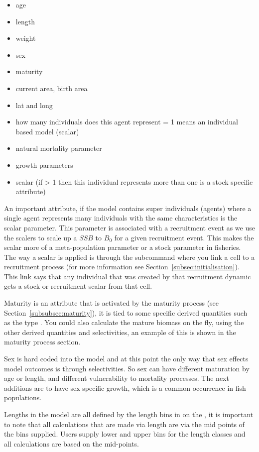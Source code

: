 \begin{itemize}
	\item age
	\item length
	\item weight
	\item sex
	\item maturity
	\item current area, birth area
	\item lat and long
	\item {} how many individuals does this agent represent = 1 means an individual based model (scalar)
	\item natural mortality parameter
	\item growth parameters
	\item scalar (if > 1 then this individual represents more than one is a stock specific attribute)
\end{itemize}

An important attribute, if the model contains super individuals (agents) where a single agent represents many individuals with the same characteristics is the scalar parameter. This parameter is associated with a recruitment event as we use the scalers to scale up a $SSB$ to $B_0$ for a given recruitment event. This makes the scalar more of a meta-population parameter or a stock parameter in fisheries. The way a scalar is applied is through the subcommand  where you link a cell to a recruitment process (for more information see Section~\ref{subsec:initialisation}). This link says that any individual that was created by that recruitment dynamic gets a stock or recruitment scalar from that cell.

Maturity is an attribute that is activated by the maturity process (see Section~\ref{subsubsec:maturity}), it is tied to some specific derived quantities such as the type . You could also calculate the mature biomass on the fly, using the other derived quantities and selectivities, an example of this is shown in the maturity process section.

Sex is hard coded into the model and at this point the only way that sex effects model outcomes is through selectivities. So sex can have different maturation by age or length, and different vulnerability to mortality processes. The next additions are to have sex specific growth, which is a common occurrence in fish populations.

Lengths in the model are all defined by the length bins in on the , it is important to note that all calculations that are made via length are via the mid points of the bins supplied. Users supply lower and upper bins for the length classes and all calculations are based on the mid-points.

